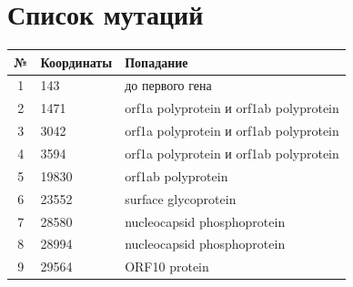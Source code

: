 \documentclass{article}
\begin{document}
  \section{Список мутаций}
  \begin{center}
    \begin{tabular}{|c|l|l|}
      \hline
      № & Координаты & Попадание
      \\\hline
      1 & 143 & до первого гена \\
      2 & 1471 & orf1a polyprotein и orf1ab polyprotein \\
      3 & 3042 & orf1a polyprotein и orf1ab polyprotein \\
      4 & 3594 & orf1a polyprotein и orf1ab polyprotein \\
      5 & 19830 & orf1ab polyprotein \\
      6 & 23552 & surface glycoprotein \\
      7 & 28580 & nucleocapsid phosphoprotein \\
      8 & 28994 & nucleocapsid phosphoprotein \\
      9 & 29564 & ORF10 protein \\
      \hline
    \end{tabular}
  \end{center}
\end{document}
